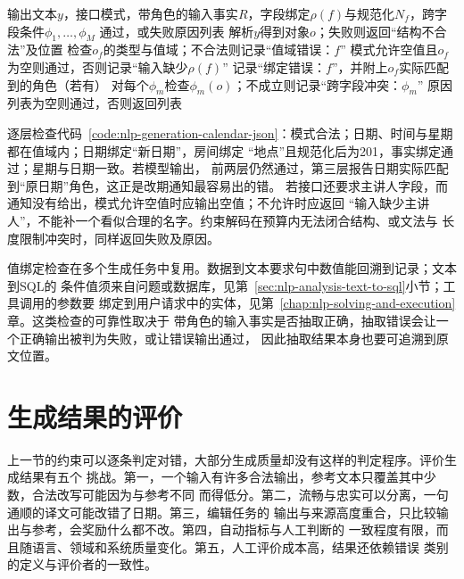 \begin{algorithm}[结构化输出的分层核验]
  \label{alg:nlp-generation-binding-check}
  \begin{algorithmic}[1]
    \Require 输出文本$y$，接口模式，带角色的输入事实$R$，字段绑定$\rho(f)$与规范化$N_f$，跨字段条件$\phi_1,\ldots,\phi_M$
    \Ensure 通过，或失败原因列表
    \State 解析$y$得到对象$o$；失败则返回“结构不合法”及位置
      \State 检查$o_f$的类型与值域；不合法则记录“值域错误：$f$”
        \State 模式允许空值且$o_f$为空则通过，否则记录“输入缺少$\rho(f)$”
        \State 记录“绑定错误：$f$”，并附上$o_f$实际匹配到的角色（若有）
      \EndIf
    \EndFor
    \State 对每个$\phi_m$检查$\phi_m(o)$；不成立则记录“跨字段冲突：$\phi_m$”
    \State \Return 原因列表为空则通过，否则返回列表
  \end{algorithmic}
\end{algorithm}

逐层检查代码~\ref{code:nlp-generation-calendar-json}：模式合法；日期、时间与星期都在值域内；日期绑定“新日期”，房间绑定
“地点”且规范化后为201，事实绑定通过；星期与日期一致。若模型输出，
前两层仍然通过，第三层报告日期实际匹配到“原日期”角色，这正是改期通知最容易出的错。
若接口还要求主讲人字段，而通知没有给出，模式允许空值时应输出空值；不允许时应返回
“输入缺少主讲人”，不能补一个看似合理的名字。约束解码在预算内无法闭合结构、或文法与
长度限制冲突时，同样返回失败及原因。

值绑定检查在多个生成任务中复用。数据到文本要求句中数值能回溯到记录；文本到SQL的
条件值须来自问题或数据库，见第~\ref{sec:nlp-analysis-text-to-sql}小节；工具调用的参数要
绑定到用户请求中的实体，见第~\ref{chap:nlp-solving-and-execution}章。这类检查的可靠性取决于
带角色的输入事实是否抽取正确，抽取错误会让一个正确输出被判为失败，或让错误输出通过，
因此抽取结果本身也要可追溯到原文位置。

\section{生成结果的评价}
\label{sec:nlp-generation-evaluation}

上一节的约束可以逐条判定对错，大部分生成质量却没有这样的判定程序。评价生成结果有五个
挑战。第一，一个输入有许多合法输出，参考文本只覆盖其中少数，合法改写可能因为与参考不同
而得低分。第二，流畅与忠实可以分离，一句通顺的译文可能改错了日期。第三，编辑任务的
输出与来源高度重合，只比较输出与参考，会奖励什么都不改。第四，自动指标与人工判断的
一致程度有限，而且随语言、领域和系统质量变化。第五，人工评价成本高，结果还依赖错误
类别的定义与评价者的一致性。

